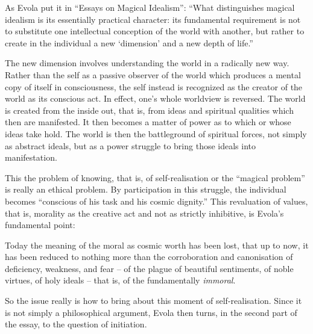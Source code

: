 As Evola put it in ``Essays on Magical Idealism'': ``What distinguishes magical idealism is its essentially practical character: its fundamental requirement is not to substitute one intellectual conception of the world with another, but rather to create in the individual a new `dimension' and a new depth of life.''

The new dimension involves understanding the world in a radically new way. Rather than the self as a passive observer of the world which produces a mental copy of itself in consciousness, the self instead is recognized as the creator of the world as its conscious act. In effect, one's whole worldview is reversed. The world is created from the inside out, that is, from ideas and spiritual qualities which then are manifested. It then becomes a matter of power as to which or whose ideas take hold. The world is then the battleground of spiritual forces, not simply as abstract ideals, but as a power struggle to bring those ideals into manifestation.

This the problem of knowing, that is, of self-realisation or the ``magical problem'' is really an ethical problem. By participation in this struggle, the individual becomes ``conscious of his task and his cosmic dignity.'' This revaluation of values, that is, morality as the creative act and not as strictly inhibitive, is Evola's fundamental point:

\begin{quotex}
Today the meaning of the moral as cosmic worth has been lost, that up to now, it has been reduced to nothing more than the corroboration and canonisation of deficiency, weakness, and fear -- of the plague of beautiful sentiments, of noble virtues, of holy ideals -- that is, of the fundamentally \emph{immoral}.
\end{quotex}


So the issue really is how to bring about this moment of self-realisation. Since it is not simply a philosophical argument, Evola then turns, in the second part of the essay, to the question of initiation.


